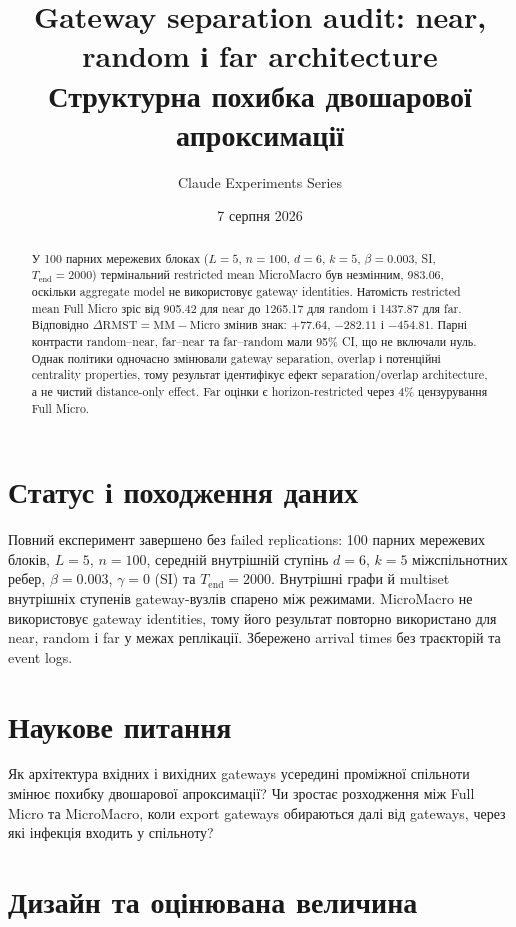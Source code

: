 \documentclass[11pt,a4paper]{article}
\title{\textbf{Gateway separation audit: near, random і far architecture}\\[0.4em]
\large Структурна похибка двошарової апроксимації}
\author{Claude Experiments Series}
\date{7 серпня 2026}
\begin{document}
\sloppy
\maketitle

\begin{abstract}
У 100 парних мережевих блоках ($L=5$, $n=100$, $d=6$, $k=5$,
$\beta=0.003$, SI, $T_{\mathrm{end}}=2000$) термінальний restricted mean
MicroMacro був незмінним, 983.06, оскільки aggregate model не використовує
gateway identities. Натомість restricted mean Full Micro зріс від 905.42 для
near до 1265.17 для random і 1437.87 для far. Відповідно
$\Delta\mathrm{RMST}=\mathrm{MM}-\mathrm{Micro}$ змінив знак: $+77.64$,
$-282.11$ і $-454.81$. Парні контрасти random--near, far--near та far--random
мали 95\% CI, що не включали нуль. Однак політики одночасно змінювали
gateway separation, overlap і потенційні centrality properties, тому результат
ідентифікує ефект separation/overlap architecture, а не чистий distance-only
effect. Far оцінки є horizon-restricted через 4\% цензурування Full Micro.
\end{abstract}

\tableofcontents
\clearpage

\section{Статус і походження даних}\label{sec:status}

Повний експеримент завершено без failed replications: 100 парних мережевих
блоків, $L=5$, $n=100$, середній внутрішній ступінь $d=6$, $k=5$
міжспільнотних ребер, $\beta=0.003$, $\gamma=0$ (SI) та
$T_{\mathrm{end}}=2000$. Внутрішні графи й multiset внутрішніх ступенів
gateway-вузлів спарено між режимами. MicroMacro не використовує gateway
identities, тому його результат повторно використано для near, random і far
у межах реплікації. Збережено arrival times без траєкторій та event logs.

\section{Наукове питання}\label{sec:question}

Як архітектура вхідних і вихідних gateways усередині проміжної спільноти
змінює похибку двошарової апроксимації? Чи зростає розходження між Full Micro
та MicroMacro, коли export gateways обираються далі від gateways, через які
інфекція входить у спільноту?

\section{Дизайн та оцінювана величина}\label{sec:design}
\end{document}
